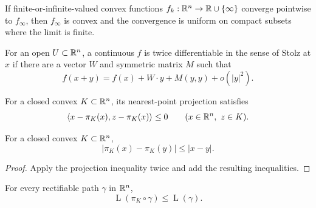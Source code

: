 \begin{lemma}
\label{lem:chow-iii-h6-convex-limits}
If finite-or-infinite-valued convex functions $f_k:\mathbb R^n\to\mathbb R\cup\{\infty\}$ converge
pointwise to $f_\infty$, then $f_\infty$ is convex and the convergence is uniform on
compact subsets where the limit is finite.
\end{lemma}

\begin{definition}
\label{def:chow-iii-h7-stolz-differentiability}
For an open $U\subset\mathbb R^n$, a continuous $f$ is twice differentiable in the sense of
Stolz at $x$ if there are a vector $W$ and symmetric matrix $M$ such that
\[
f(x+y)=f(x)+W\cdot y+M(y,y)+o(|y|^2).
\]
\end{definition}

\begin{lemma}
\label{lem:chow-iii-h8-projection-inequality}
For a closed convex $K\subset\mathbb R^n$, its nearest-point projection satisfies
\[
\langle x-\pi_K(x),z-\pi_K(x)\rangle\le0
\qquad(x\in\mathbb R^n,\ z\in K).
\]
\end{lemma}

\begin{proposition}
\label{prop:chow-iii-h9-projection-contraction}

For a closed convex $K\subset\mathbb R^n$,
\[
|\pi_K(x)-\pi_K(y)|\le |x-y|.
\]
\end{proposition}
\begin{proof}
\sketch
Apply the projection inequality twice and add the resulting inequalities.
\end{proof}

\begin{corollary}
\label{cor:chow-iii-h10-projection-length}

For every rectifiable path $\gamma$ in $\mathbb R^n$,
\[
\operatorname{L}(\pi_K\circ\gamma)\le \operatorname{L}(\gamma).
\]
\end{corollary}

